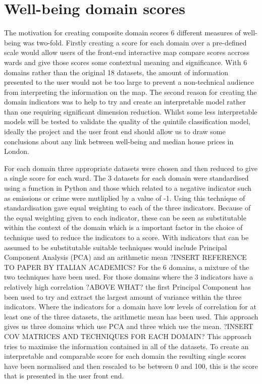 \section{Well-being domain scores}

The motivation for creating composite domain scores 6 different measures of well-being was two-fold. Firstly creating a score for each domain over a pre-defined scale would allow users of the front-end interactive map compare scores accross wards and give those scores some contextual meaning and significance. With 6 domains rather than the original 18 datasets, the amount of information presented to the user would not be too large to prevent a non-technical audience from interpreting the information on the map. The second reason for creating the domain indicators was to help to try and create an interpretable model rather than one requiring significant dimension reduction. Whilst some less interpretable models will be tested to validate the quality of the quintile classification model, ideally the project and the user front end should allow us to draw some conclusions about any link between well-being and median house prices in London.

For each domain three appropriate datasets were chosen and then reduced to give a single score for each ward. The 3 datasets for each domain were standardised using a function in Python and those which related to a negative indicator such as emissions or crime were mutliplied by a value of -1. Using this technique of standardisation gave equal weighting to each of the three indicators. Because of the equal weighting given to each indicator, these can be seen as substitutable within the context of the domain which is a important factor in the choice of technique used to reduce the indicators to a score. With indicators that can be assumed to be substitutable suitable techniques would include Principal Component Analysis (PCA) and an arithmetic mean
?INSERT REFERENCE TO PAPER BY ITALIAN ACADEMICS?
For the 6 domains, a mixture of the two techniques have been used. For those domains where the 3 indicators have a relatively high correlation ?ABOVE WHAT? the first Principal Component has been used to try and extract the largest amount of variance within the three indicators. Where the indicators for a domain have low levels of correlation for at least one of the three datasets, the arithmetic mean has been used. This approach gives us three domains which use PCA and three which use the mean.
?INSERT COV MATRICES AND TECHNIQUES FOR EACH DOMAIN?
This approach tries to maximise the information contained in all of the datasets.
To create an interpretable and comparable score for each domain the resulting single scores have been normalised and then rescaled to be between 0 and 100, this is the score that is presented in the user front end.


